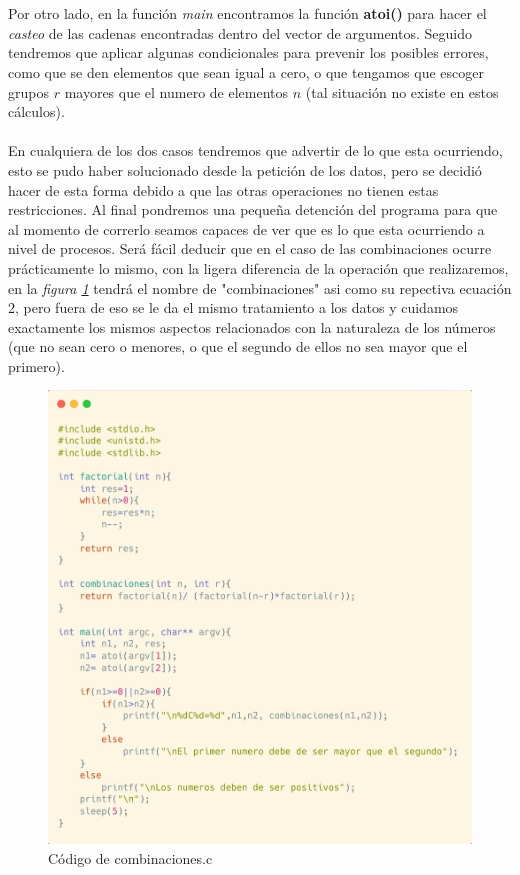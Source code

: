 \documentclass[10pt]{article}
\begin{document}
	\\\\
	Por otro lado, en la función \textit{main} encontramos la función \textbf{atoi()} para hacer el \textit{casteo} de las cadenas encontradas dentro del vector de argumentos. Seguido tendremos que aplicar algunas condicionales para prevenir los posibles errores, como que se den elementos que sean igual a cero, o que tengamos que escoger grupos $r$ mayores que el numero de elementos $n$ (tal situación no existe en estos cálculos). 
	\\\\
	En cualquiera de los dos casos tendremos que advertir de lo que esta ocurriendo, esto se pudo haber solucionado desde la petición de los datos, pero se decidió hacer de esta forma debido a que las otras operaciones no tienen estas restricciones. Al final pondremos una pequeña detención del programa para que al momento de correrlo seamos capaces de ver que es lo que esta ocurriendo a nivel de procesos. 
	\newpage
	Será fácil deducir que en el caso de las combinaciones ocurre prácticamente lo mismo, con la ligera diferencia de la operación que realizaremos, en la \emph{figura \ref{fig:combinaciones}} tendrá el nombre de "combinaciones" asi como su repectiva ecuación $2$, pero fuera de eso se le da el mismo tratamiento a los datos y cuidamos exactamente los mismos aspectos relacionados con la naturaleza de los números (que no sean cero o menores, o que el segundo de ellos no sea mayor que el primero). 
	\begin{figure}[h!]
		\centering
		\includegraphics[width=0.7\linewidth]{combinaciones.png}
		\caption{Código de combinaciones.c}
		\label{fig:combinaciones}
	\end{figure}
\end{document}
